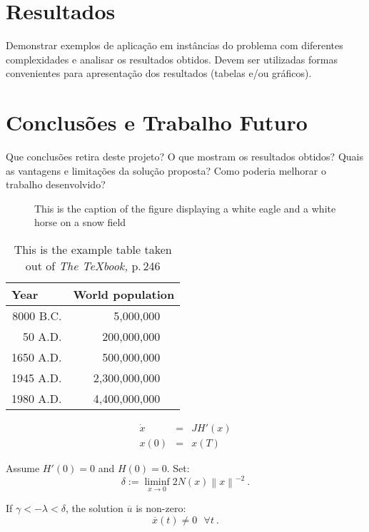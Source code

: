 \documentclass{llncs}
\begin{document}
\section{Resultados}
Demonstrar exemplos de aplicação em instâncias do problema com
diferentes complexidades e analisar os resultados obtidos. Devem ser utilizadas formas
convenientes para apresentação dos resultados (tabelas e/ou gráficos).

\section{Conclusões e Trabalho Futuro}
 Que conclusões retira deste projeto? O que mostram os resultados obtidos? Quais as vantagens e limitações da
solução proposta? Como poderia melhorar o trabalho desenvolvido?

\begin{figure}
\vspace{2.5cm}
\caption{This is the caption of the figure displaying a white eagle and
a white horse on a snow field}
\end{figure}

\begin{table}
\caption{This is the example table taken out of {\it The
\TeX{}book,} p.\,246}
\begin{center}
\begin{tabular}{r@{\quad}rl}
\hline
\multicolumn{1}{l}{\rule{0pt}{12pt}
                   Year}&\multicolumn{2}{l}{World population}\\[2pt]
\hline\rule{0pt}{12pt}
8000 B.C.  &     5,000,000& \\
  50 A.D.  &   200,000,000& \\
1650 A.D.  &   500,000,000& \\
1945 A.D.  & 2,300,000,000& \\
1980 A.D.  & 4,400,000,000& \\[2pt]
\hline
\end{tabular}
\end{center}
\end{table}

\begin{equation}
\begin{array}{rcl}
  \dot{x}&=&JH' (x)\\
  x(0)&=&x (T)
\end{array}
\end{equation}


\begin{proposition}
Assume $H'(0)=0$ and $ H(0)=0$. Set:
\begin{equation}
  \delta := \liminf_{x\to 0} 2 N (x) \left\|x\right\|^{-2}\ .
  \label{eq:one}
\end{equation}

If $\gamma < - \lambda < \delta$,
the solution $\overline{u}$ is non-zero:
\begin{equation}
  \overline{x} (t) \ne 0\ \ \ \forall t\ .
\end{equation}
\end{proposition}
\end{document}
